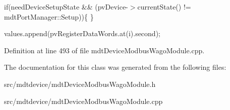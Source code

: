 if(needDeviceSetupState \&\& (pvDevice-\/$>$currentState() != mdtPortManager::Setup))\{ \}

values.append(pvRegisterDataWords.at(i).second); 



Definition at line 493 of file mdtDeviceModbusWagoModule.cpp.



The documentation for this class was generated from the following files:\begin{DoxyCompactItemize}
\item 
src/mdtdevice/mdtDeviceModbusWagoModule.h\item 
src/mdtdevice/mdtDeviceModbusWagoModule.cpp\end{DoxyCompactItemize}
